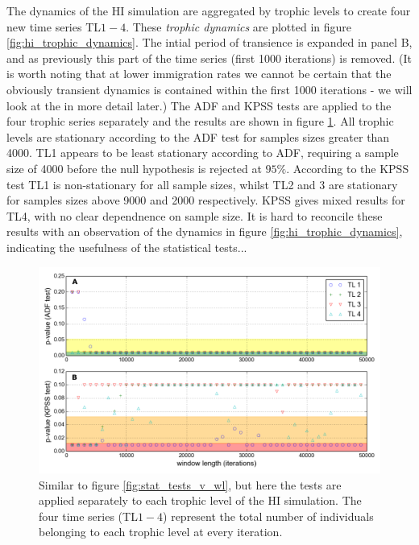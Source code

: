 The dynamics of the HI simulation are aggregated by trophic levels to create four new time series TL$1-4$. These \emph{trophic dynamics} are plotted in figure \ref{fig:hi_trophic_dynamics}. The intial period of transience is expanded in panel B, and as previously this part of the time series (first 1000 iterations) is removed. (It is worth noting that at lower immigration rates we cannot be certain that the obviously transient dynamics is contained within the first 1000 iterations - we will look at the in more detail later.) The ADF and KPSS tests are applied to the four trophic series separately and the results are shown in figure \ref{fig:tl_stat_tests_v_wl}. All trophic levels are stationary according to the ADF test for samples sizes greater than 4000. TL1 appears to be least stationary according to ADF, requiring a sample size of 4000 before the null hypothesis is rejected at $95\%$. According to the KPSS test TL1 is non-stationary for all sample sizes, whilst TL2 and 3 are stationary for samples sizes above 9000 and 2000 respectively. KPSS gives mixed results for TL4, with no clear dependnence on sample size. It is hard to reconcile these results with an observation of the dynamics in figure \ref{fig:hi_trophic_dynamics}, indicating the usefulness of the statistical tests...

\begin{figure}[hb!]
	\centering
	\includegraphics[width=0.8\linewidth]{"./chapters/chapter04b/figures/Rtests/tl_stat_tests_v_wl"}
     \caption{Similar to figure \ref{fig:stat_tests_v_wl}, but here the tests are applied separately to each trophic level of the HI simulation. The four time series (TL$1-4$) represent the total number of individuals belonging to each trophic level at every iteration.} 
     \label{fig:tl_stat_tests_v_wl}   
\end{figure}

